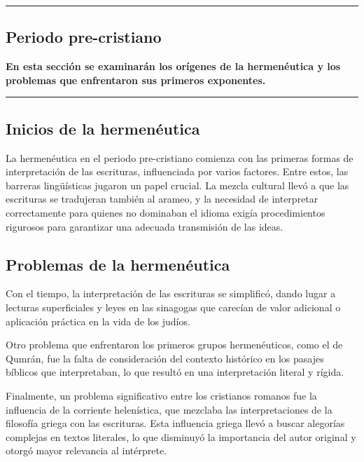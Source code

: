 {\color{gray}\hrule}
\begin{center}


\section{Periodo pre-cristiano}
\textbf{En esta sección se examinarán los orígenes de la hermenéutica y los problemas que enfrentaron sus primeros exponentes.}
\end{center}

{\color{gray}\hrule}
\begin{multicols}{2}

\subsection{Inicios de la hermenéutica}

La hermenéutica en el periodo pre-cristiano comienza con las primeras formas de interpretación de las escrituras, influenciada por varios factores. Entre estos, las barreras lingüísticas jugaron un papel crucial. La mezcla cultural llevó a que las escrituras se tradujeran también al arameo, y la necesidad de interpretar correctamente para quienes no dominaban el idioma exigía procedimientos rigurosos para garantizar una adecuada transmisión de las ideas.

\subsection{Problemas de la hermenéutica}

Con el tiempo, la interpretación de las escrituras se simplificó, dando lugar a lecturas superficiales y leyes en las sinagogas que carecían de valor adicional o aplicación práctica en la vida de los judíos.

Otro problema que enfrentaron los primeros grupos hermenéuticos, como el de Qumrán, fue la falta de consideración del contexto histórico en los pasajes bíblicos que interpretaban, lo que resultó en una interpretación literal y rígida.

Finalmente, un problema significativo entre los cristianos romanos fue la influencia de la corriente helenística, que mezclaba las interpretaciones de la filosofía griega con las escrituras. Esta influencia griega llevó a buscar alegorías complejas en textos literales, lo que disminuyó la importancia del autor original y otorgó mayor relevancia al intérprete.

\end{multicols}
